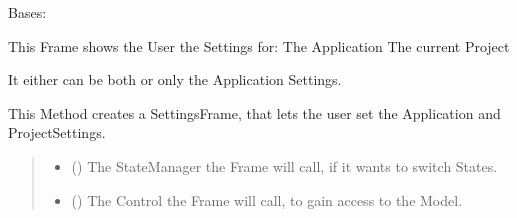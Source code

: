 \documentclass[letterpaper,10pt,english]{sphinxmanual}
\begin{document}
\begin{fulllineitems}
\label{\detokenize{apidoc/src.osm_configurator.view.toplevelframes:src.osm_configurator.view.toplevelframes.settings_frame.SettingsFrame}}
\pysigstartsignatures
{}
\pysigstopsignatures
\sphinxAtStartPar
Bases: {\hyperref[\detokenize{apidoc/src.osm_configurator.view.toplevelframes:src.osm_configurator.view.toplevelframes.top_level_frame.TopLevelFrame}]{}}

\sphinxAtStartPar
This Frame shows the User the Settings for:
\sphinxhyphen{} The Application
\sphinxhyphen{} The current Project

\sphinxAtStartPar
It either can be both or only the Application Settings.

\begin{fulllineitems}
\label{\detokenize{apidoc/src.osm_configurator.view.toplevelframes:src.osm_configurator.view.toplevelframes.settings_frame.SettingsFrame.__init__}}
\pysigstartsignatures
{}
\pysigstopsignatures
\sphinxAtStartPar
This Method creates a SettingsFrame, that lets the user set the Application and Project\sphinxhyphen{}Settings.
\begin{quote}\begin{description}
\begin{itemize}
\item {} 
\sphinxAtStartPar
{} ({\hyperref[\detokenize{apidoc/src.osm_configurator.view.states:src.osm_configurator.view.states.state_manager.StateManager}]{}}) \textendash{} The StateManager the Frame will call, if it wants to switch States.

\item {} 
\sphinxAtStartPar
{} ({\hyperref[\detokenize{apidoc/src.osm_configurator.control:src.osm_configurator.control.control_interface.IControl}]{}}) \textendash{} The Control the Frame will call, to gain access to the Model.

\end{itemize}

\end{description}\end{quote}

\end{fulllineitems}


\end{fulllineitems}
\end{document}
